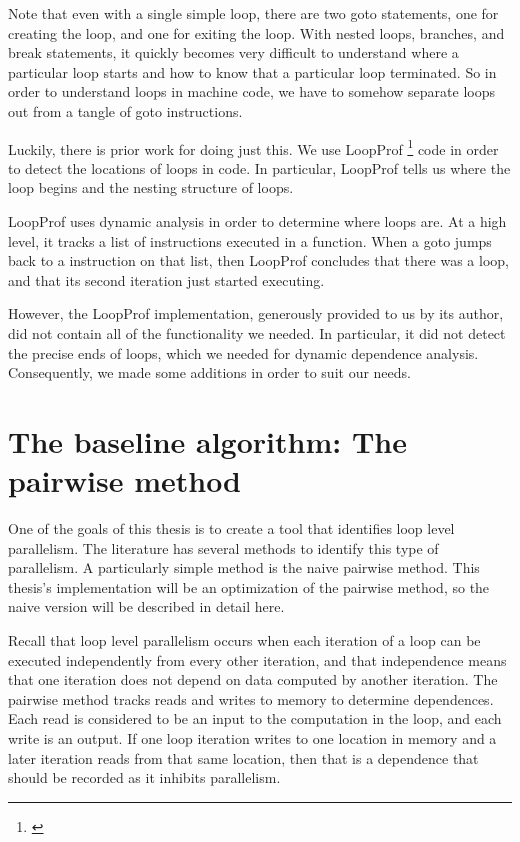 \documentclass[12pt,twoside]{reedthesis}
\begin{document}
		Note that even with a single simple loop, there are two goto statements, one for creating the loop, and one for exiting the loop. With nested loops, branches, and break statements, it quickly becomes very difficult to understand where a particular loop starts and how to know that a particular loop terminated.
		So in order to understand loops in machine code, we have to somehow separate loops out from a tangle of goto instructions. 
		
		Luckily, there is prior work for doing just this. We use LoopProf \footnote{\cite{Chen:2004}} code in order to detect the locations of loops in code. In particular, LoopProf tells us where the loop begins and the nesting structure of loops. 
		
		LoopProf uses dynamic analysis in order to determine where loops are. At a high level, it tracks a list of instructions executed in a function. When a goto jumps back to a instruction on that list, then LoopProf concludes that there was a loop, and that its second iteration just started executing. 
		
		However, the LoopProf implementation, generously provided to us by its author, did not contain all of the functionality we needed. In particular, it did not detect the precise ends of loops, which we needed for dynamic dependence analysis. Consequently, we made some additions in order to suit our needs. 
		
	\section{The baseline algorithm: The pairwise method}
	
		One of the goals of this thesis is to create a tool that identifies loop level parallelism. The literature has several methods to identify this type of parallelism. A particularly simple method is the naive pairwise method. This thesis's implementation will be an optimization of the pairwise method, so the naive version will be described in detail here. 
		
		Recall that loop level parallelism occurs when each iteration of a loop can be executed independently from every other iteration, and that independence means that one iteration does not depend on data computed by another iteration. 
		The pairwise method tracks reads and writes to memory to determine dependences. Each read is considered to be an input to the computation in the loop, and each write is an output. If one loop iteration writes to one location in memory and a later iteration reads from that same location, then that is a dependence that should be recorded as it inhibits parallelism. 
		
\end{document}

